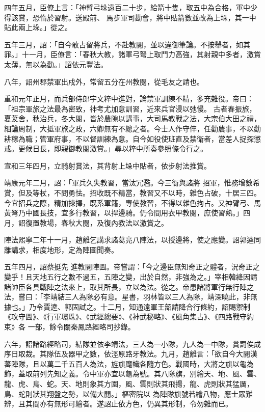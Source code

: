 \begin{pinyinscope}
 四年五月，臣僚上言：「神臂弓垛遠百二十步，給箭十隻，取五中為合格，軍中少得該賞，恐惰於習射。送殿前、
 馬步軍司勘會，將中貼箭數並改為上垛，其一中貼此兩上垛。」從之。



 五年三月，詔：「自今敢占留將兵，不赴教閱，並以違御筆論。不按舉者，如其罪。」十一月，臣僚言：「春秋大教，諸軍弓弩上取鬥力高強，其射親中多者，激賞太薄，無以為勸。」詔依元豐法。



 八年，詔州郡禁軍出戍外，常留五分在州教閱，從毛友之請也。



 重和元年正月，而兵部侍郎宇文粹中進對，論禁軍訓練不精，多充雜役。帝曰：「祖宗軍旅之法最為密致，神考尤加意訓習，近來兵官浸以弛慢。
 古者春振旅，夏茇舍，秋治兵，冬大閱，皆於農隙以講事，大司馬教戰之法，大宗伯大田之禮，細論周制，大抵軍旅之政，六卿無有不總之者。今士人作守倅，任勸農事，不以勸耕稼為職；管軍府事，不以督訓練為意。自今如役使班直及禁衛者，當差人捉探懲戒。更候日長，即親御教閱激賞。」尋以粹中所奏參照條令行之。



 宣和三年四月，立騎射賞法，其背射上垛中貼者，依步射法推賞。



 靖康元年二月，詔：「軍兵久失教習，當汰冗濫。今三衙與諸將
 招軍，惟務增數希賞，但及等杖，不問勇怯。招收既不精當，教習又不以時，雜色占破，十居三四。今宜招兵之際，精加揀擇，既系軍籍，專使教習，不得以雜色拘占。又神臂弓、馬黃弩乃中國長技，宜多行教習，以捍邊騎。仍令間用衣甲教閱，庶使習熟。」四月，詔復置教場，春秋大閱，及復內教法以激賞之。



 陣法熙寧二年十一月，趙離乞講求諸葛亮八陣法，以授邊將，使之應變。詔郭逵同離講求，相度地形，定為陣圖聞奏。



 五年四月，詔蔡挺先
 進教閱陣圖。帝嘗謂：「今之邊臣無知奇正之體者，況奇正之變乎！且天地五行之數不過五，五陣之變，出於自然，非強為之。」宰相韓絳因請諸帥臣各具戰陣之法來上，取其所長，立以為法。從之。帝患諸將軍行無行陣之法，嘗曰：「李靖結三人為隊必有意。星書，羽林皆以三人為隊，靖深曉此，非無據也。」乃令賈逵、郭固試之。十二月，知通遠軍王韶請降合行條約，詔賜禦制《攻守圖》、《行軍環珠》、《武經總要》、《神武秘略》、《風角集占》、《四路戰守約束》各
 一部，餘令關秦鳳路經略司抄錄。



 六年，詔諸路經略司，結隊並依李靖法，三人為一小隊，九人為一中隊，賞罰俟成序日取裁。其隊伍及器甲之數，依涇原路牙教法。九月，趙離言：「欲自今大閱漢蕃陣隊，且以萬二千五百人為法，旌旗麾幟各隨方色。戰國時，大將之旗以龜為飾，蓋取前列先知之義。令中軍亦宜以龜為號。其八隊旗，別繪天、地、風、雲、龍、虎、鳥、蛇。天、地則象其方園，風、雲則狀其飛揚，龍、虎則狀其猛厲，鳥、蛇則狀其翔盤之勢，以備大閱。」樞密院以
 為陣隊旗號若繪八物，應士眾難辨，且其間亦有無形可繪者。遂詔止依方色，仍異其形制，令勿雜而已。




\end{pinyinscope}
